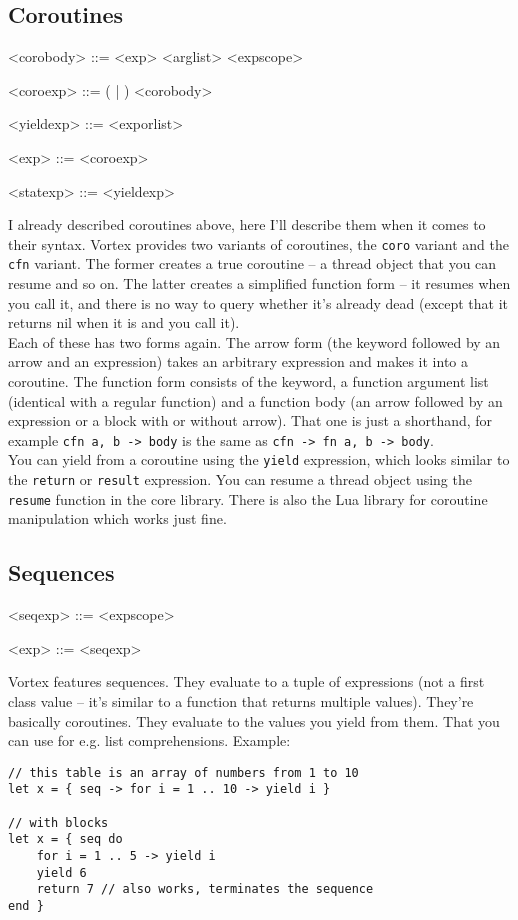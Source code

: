 \documentclass{article}
\newenvironment{bnf}
{
\begin{mdframed}
\begin{grammar}
}
{
\end{grammar}
\end{mdframed}
}
\begin{document}
\subsection{Coroutines}
\begin{bnf}
<corobody> ::= \lit{->} <exp>
    \alt <arglist> <expscope>

<coroexp> ::= ( | ) <corobody>

<yieldexp> ::=  <exporlist>

<exp> ::= <coroexp>

<statexp> ::= <yieldexp>
\end{bnf}
I already described coroutines above, here I'll describe them when it comes to
their syntax. Vortex provides two variants of coroutines, the \verb|coro|
variant and the \verb|cfn| variant. The former creates a true coroutine --
a thread object that you can resume and so on. The latter creates a simplified
function form -- it resumes when you call it, and there is no way to query
whether it's already dead (except that it returns nil when it is and you
call it).\\
Each of these has two forms again. The arrow form (the keyword followed by
an arrow and an expression) takes an arbitrary expression and makes it into
a coroutine. The function form consists of the keyword, a function argument
list (identical with a regular function) and a function body (an arrow followed
by an expression or a block with or without arrow). That one is just a
shorthand, for example \verb|cfn a, b -> body| is the same as
\verb|cfn -> fn a, b -> body|.\\
You can yield from a coroutine using the \verb|yield| expression, which looks
similar to the \verb|return| or \verb|result| expression. You can resume a
thread object using the \verb|resume| function in the core library. There
is also the Lua library for coroutine manipulation which works just fine.
\subsection{Sequences}
\begin{bnf}
<seqexp> ::=  <expscope>

<exp> ::= <seqexp>
\end{bnf}
Vortex features sequences. They evaluate to a tuple of expressions (not a
first class value -- it's similar to a function that returns multiple values).
They're basically coroutines. They evaluate to the values you yield from them.
That you can use for e.g. list comprehensions. Example:
\begin{lstlisting}[language=vortex]
// this table is an array of numbers from 1 to 10
let x = { seq -> for i = 1 .. 10 -> yield i }

// with blocks
let x = { seq do
    for i = 1 .. 5 -> yield i
    yield 6
    return 7 // also works, terminates the sequence
end }
\end{lstlisting}
\end{document}
